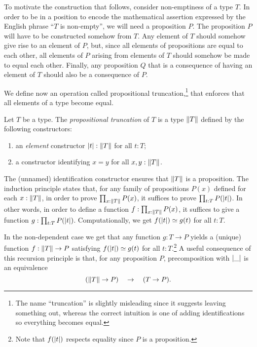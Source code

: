 To motivate the construction that follows, consider non-emptiness of a type $T$.  In order to be in a position to encode the mathematical
assertion expressed by the English phrase ``$T$ is non-empty'', we will need a proposition $P$.  The proposition $P$ will have to be constructed
somehow from $T$.  Any element of $T$ should somehow give rise to an element of $P$, but, since all elements of propositions are equal to each
other, all elements of $P$ arising from elements of $T$ should somehow be made to equal each other.  Finally, any proposition $Q$ that is a
consequence of having an element of $T$ should also be a consequence of $P$.

We define now an operation called propositional truncation,\footnote{%
The name ``truncation'' is slightly misleading since it suggests leaving
something out, whereas the correct intuition is one of adding identifications
so everything becomes equal.}
that enforces that all elements of a type become equal.

\begin{definition}\label{def:prop-trunc}
Let $T$ be a type. The \emph{propositional truncation} of $T$
is a type  $\lVert T\rVert$ defined by the following constructors:
\begin{enumerate}
\item an \emph{element} constructor $\lvert t\rvert : \lVert T\rVert$ for all $t:T$;
\item a constructor identifying $x=y$  for all $x,y:\lVert T\rVert$.
\end{enumerate}
The (unnamed) identification constructor ensures that $\lVert T\rVert$ is a
proposition. The induction principle states that,
for any family of propositions $P(x)$ defined for each $x:\lVert T\rVert$,
in order to prove $\prod_{x:\lVert T\rVert} P(x)$,
it suffices to prove $\prod_{t:T} P(\lvert t\rvert)$. In other
words, in order to define a function $f:\prod_{x:\lVert T\rVert} P(x)$,
it suffices to give a function $g: \prod_{t:T} P(\lvert t\rvert)$.
Computationally, we get $f(\trunc{t})\jdeq g(t)$ for all $t:T$.
\end{definition}

In the non-dependent case we get that
any function $g: T\to P$ yields a (unique) function $f:\lVert T\rVert\to P$
satisfying $f(\trunc{t})\jdeq g(t)$ for all $t:T$.\footnote{%
Note that $f(\lvert t\rvert)$ respects equality since $P$ is a proposition.}
A useful consequence of this recursion principle is that,
for any proposition $P$, precomposition with $\lvert\_\rvert$ is an equivalence
\[
(\lVert T\rVert \to P) \quad \to \quad (T \to P).
\]

